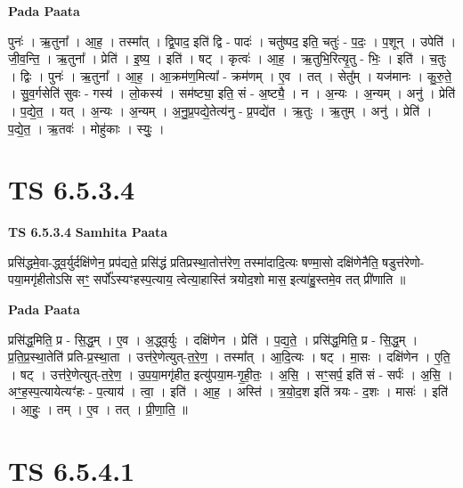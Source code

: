 \documentclass[17pt]{extarticle}
\begin{document}
\textbf{Pada Paata} \newline

पुनः॑ । ऋ॒तुना᳚ । आ॒ह॒ । तस्मा᳚त् । द्वि॒पाद॒ इति॑ द्वि - पादः॑ । चतु॑ष्पद॒ इति॒ चतुः॑ - प॒दः॒ । प॒शून् । उपेति॑ । जी॒व॒न्ति॒ । ऋ॒तुना᳚ । प्रेति॑ । इ॒ष्य॒ । इति॑ । षट् । कृत्वः॑ । आ॒ह॒ । ऋ॒तुभि॒रित्यृ॒तु - भिः॒ । इति॑ । च॒तुः । द्विः । पुनः॑ । ऋ॒तुना᳚ । आ॒ह॒ । आ॒क्रम॑ण॒मित्या᳚ - क्रम॑णम् । ए॒व । तत् । सेतु᳚म् । यज॑मानः । कु॒रु॒ते॒ । सु॒व॒र्गसेति॑ सुवः - गस्य॑ । लो॒कस्य॑ । सम॑ष्ट्या॒ इति॒ सं - अ॒ष्ट्यै॒ । न । अ॒न्यः । अ॒न्यम् । अनु॑ । प्रेति॑ । प॒द्ये॒त॒ । यत् । अ॒न्यः । अ॒न्यम् । अ॒नु॒प्र॒पद्ये॒तेत्य॑नु - प्र॒पद्ये॑त । ऋ॒तुः । ऋ॒तुम् । अनु॑ । प्रेति॑ । प॒द्ये॒त॒ । ऋ॒तवः॑ । मोहु॑काः । स्युः॒ ।  \newline





\section{ TS 6.5.3.4 }

\textbf{TS 6.5.3.4 } \newline
\textbf{Samhita Paata} \newline

प्रसि॑द्धमे॒वा-द्ध्व॒र्युर्दक्षि॑णेन॒ प्रप॑द्यते॒ प्रसि॑द्धं प्रतिप्रस्था॒तोत्त॑रेण॒ तस्मा॑दादि॒त्यः षण्मा॒सो दक्षि॑णेनैति॒ षडुत्त॑रेणो-पया॒मगृ॑हीतोऽसि सꣳ॒॒ सर्पो᳚ऽस्यꣳहस्प॒त्याय॒ त्वेत्या॒हास्ति॑ त्रयोद॒शो मास॒ इत्या॑हु॒स्तमे॒व तत् प्री॑णाति ॥ \newline

\textbf{Pada Paata} \newline

प्रसि॑द्ध॒मिति॒ प्र - सि॒द्ध॒म् । ए॒व । अ॒द्ध्व॒र्युः । दक्षि॑णेन । प्रेति॑ । प॒द्य॒ते॒ । प्रसि॑द्ध॒मिति॒ प्र - सि॒द्ध॒म् । प्र॒ति॒प्र॒स्था॒तेति॑ प्रति-प्र॒स्था॒ता । उत्त॑रे॒णेत्युत्-त॒रे॒ण॒ । तस्मा᳚त् । आ॒दि॒त्यः । षट् । मा॒सः । दक्षि॑णेन । ए॒ति॒ । षट् । उत्त॑रे॒णेत्युत्-त॒रे॒ण॒ । उ॒प॒या॒मगृ॑हीत॒ इत्यु॑पया॒म-गृ॒ही॒तः॒ । अ॒सि॒ । सꣳ॒॒सर्प॒ इति॑ सं - सर्पः॑ । अ॒सि॒ । अꣳ॒॒ह॒स्प॒त्यायेत्यꣳ॑हः - प॒त्याय॑ । त्वा॒ । इति॑ । आ॒ह॒ । अस्ति॑ । त्र॒यो॒द॒श इति॑ त्रयः - द॒शः । मासः॑ । इति॑ । आ॒हुः॒ । तम् । ए॒व । तत् । प्री॒णा॒ति॒ ॥  \newline





\section{ TS 6.5.4.1 }
\end{document}
